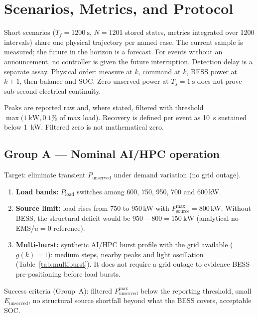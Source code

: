 \documentclass{ieeeaccess}
\begin{document}
\section{Scenarios, Metrics, and Protocol}
\label{sec:scenarios}

Short scenarios ($T_f=\SI{1200}{\second}$, $N=1201$ stored states, metrics integrated over 1200 intervals) share one physical trajectory per named case. The current sample is measured; the future in the horizon is a forecast. For events without an announcement, no controller is given the future interruption. Detection delay is a separate assay. Physical order: measure at $k$, command at $k$, BESS power at $k{+}1$, then balance and SOC. Zero unserved power at $T_s=\SI{1}{\second}$ does not prove sub-second electrical continuity.

Peaks are reported raw and, where stated, filtered with threshold $\max(\SI{1}{\kilo\watt},0.1\%$ of max load). Recovery is defined per event as \SI{10}{\second} sustained below \SI{1}{\kilo\watt}. Filtered zero is not mathematical zero.

\subsection{Group A --- Nominal AI/HPC operation}
Target: eliminate transient $P_{\mathrm{unserved}}$ under demand variation (no grid outage).
\begin{enumerate}
\item \textbf{Load bands:} $P_{\mathrm{load}}$ switches among 600, 750, 950, 700 and 600\,kW.
\item \textbf{Source limit:} load rises from 750 to 950\,kW with $P_{\mathrm{source}}^{\max}=800$\,kW. Without BESS, the structural deficit would be $950-800=\SI{150}{\kilo\watt}$ (analytical no-EMS/$u=0$ reference).
\item \textbf{Multi-burst:} synthetic AI/HPC burst profile with the grid available ($g(k)=1$): medium steps, nearby peaks and light oscillation (Table~\ref{tab:multiburst}). It does not require a grid outage to evidence BESS pre-positioning before load bursts.
\end{enumerate}
Success criteria (Group~A): filtered $P_{\mathrm{unserved}}^{\max}$ below the reporting threshold, small $E_{\mathrm{unserved}}$, no structural source shortfall beyond what the BESS covers, acceptable SOC.
\end{document}
